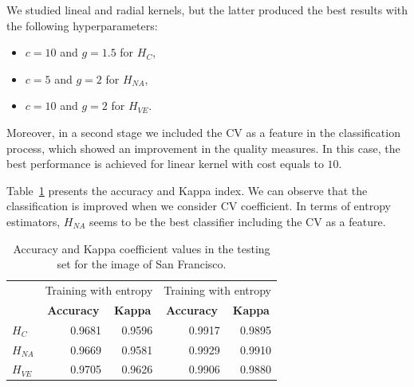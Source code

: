\documentclass[journal]{IEEEtran}
\begin{document}


We studied lineal and radial kernels, but the latter produced the best results with the following hyperparameters:
\begin{itemize}
    \item $c=10$ and $g=1.5$ for $H_C$,
    \item $c=5$ and $g=2$ for $H_{NA}$,
    \item $c=10$ and $g=2$ for $H_{VE}$.
\end{itemize}

Moreover, in a second stage we included the CV as a feature in the classification process, which showed an improvement in the quality measures. In this case, the best performance is achieved for linear kernel with cost equals to $10$.

Table~\ref{tab:acc_SF} presents the accuracy and Kappa index. 
We can observe that the classification is improved when we consider CV coefficient. In terms of entropy estimators, $H_{NA}$ seems to be the best classifier including the CV as a feature.

\begin{table}[htbp]
  \centering
  \caption{Accuracy and Kappa coefficient values in the testing set for the image of San Francisco.}
    \begin{tabular}{lrrrr}
    	\toprule
          & \multicolumn{2}{c}{\multirow{2}[-2]{*}{Training with entropy}} & \multicolumn{2}{c}{\multirow{2}[-2]{*}{Training with entropy}} \\
          & \multicolumn{2}{c}{estimators} & \multicolumn{2}{c}{estimators and cv} \\ \cmidrule(lr){2-3}\cmidrule(lr){4-5}          
& \multicolumn{1}{c}{\textbf{Accuracy}} & \multicolumn{1}{c}{\textbf{Kappa}} & \multicolumn{1}{c}{\textbf{Accuracy}} & \multicolumn{1}{c}{\textbf{Kappa}} \\
    \cmidrule(lr){2-2}\cmidrule(lr){3-3}\cmidrule(lr){4-4}\cmidrule(lr){5-5}
    $H_C$    & 0.9681 & 0.9596 & 0.9917 & 0.9895 \\
    $H_{NA}$   & 0.9669 & 0.9581 & 0.9929 & 0.9910 \\
    $H_{VE}$   & 0.9705 & 0.9626 & 0.9906 & 0.9880 \\
    \bottomrule
    \end{tabular}%
  \label{tab:acc_SF}%
\end{table}%
\end{document}
